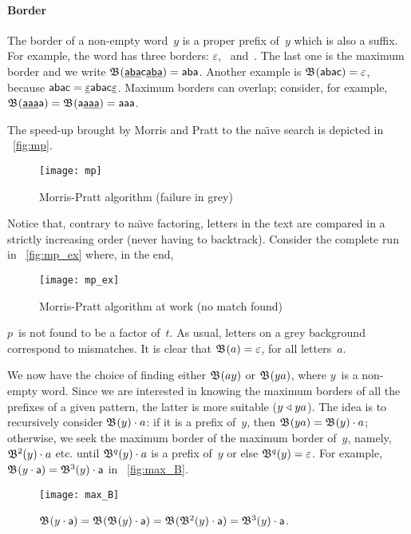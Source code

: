 \paragraph{Border}

The border of a non\hyp{}empty word~\(y\) is a proper prefix of~\(y\)
which is also a suffix. For example, the word  has three
borders: \(\varepsilon\), ~and~. The last one is the
maximum border and we write
\(\mathfrak{B}^{}(\underline{\textsf{aba}}\textsf{c}\underline{\textsf{aba}}) =
\textsf{aba}\). Another example is \(\mathfrak{B}^{}(\textsf{abac}) =
\varepsilon\), because \(\textsf{abac} =
\underline{\varepsilon}\textsf{abac}\underline{\varepsilon}\). Maximum
borders can overlap; consider, for example,
\(\mathfrak{B}^{}(\underline{\textsf{aaa}}\textsf{a}) =
\mathfrak{B}^{}(\textsf{a}\underline{\textsf{aaa}}) = \textsf{aaa}\).

The speed\hyp{}up brought by Morris and Pratt to the na\"{\i}ve search
is depicted in \fig~\vref{fig:mp}.
\begin{figure}[b]
\centering
\texttt{[image: mp]}
\caption{Morris-Pratt algorithm (failure in grey)
\label{fig:mp}}
\end{figure}
Notice that, contrary to na\"{\i}ve factoring, letters in the text are
compared in a strictly increasing order (never having to
backtrack). Consider the complete run in \fig~\vref{fig:mp_ex} where,
in the end,
\begin{figure}[t]
\centering
\texttt{[image: mp\_ex]}
\caption{Morris\hyp{}Pratt algorithm at work (no match found)
\label{fig:mp_ex}}
\end{figure}
\(p\)~is not found to be a factor of~\(t\). As usual, letters on a
grey background correspond to mismatches. It is clear that
\(\mathfrak{B}^{}(a) = \varepsilon\), for all letters~\(a\).

We now have the choice of finding either \(\mathfrak{B}^{}(ay)\) or
\(\mathfrak{B}^{}(ya)\), where \(y\)~is a non\hyp{}empty word. Since we are
interested in knowing the maximum borders of all the prefixes of a
given pattern, the latter is more suitable (\(y \mathrel{\triangleleft} ya\)). The idea
is to recursively consider \(\mathfrak{B}^{}(y) \cdot a\): if it is a prefix
of~\(y\), then \(\mathfrak{B}^{}(ya) = \mathfrak{B}^{}(y) \cdot a\); otherwise, we
seek the maximum border of the maximum border of~\(y\), namely,
\(\mathfrak{B}^{2}(y) \cdot a\) etc. until \(\mathfrak{B}^{q}(y) \cdot a\) is a
prefix of~\(y\) or else \(\mathfrak{B}^{q}(y) = \varepsilon\). For example,
\(\mathfrak{B}^{}(y \cdot \textsf{a}) = \mathfrak{B}^{3}(y) \cdot \textsf{a}\) in
\fig~\vref{fig:max_B}.
\begin{figure}[b]
\centering
\texttt{[image: max\_B]}
\caption{\(\mathfrak{B}^{}(y \cdot \textsf{a})
   = \mathfrak{B}^{}(\mathfrak{B}^{}(y) \cdot \textsf{a})
   = \mathfrak{B}^{}(\mathfrak{B}^{2}(y) \cdot \textsf{a})
   = \mathfrak{B}^{3}(y) \cdot \textsf{a}\).
\label{fig:max_B}}
\end{figure}

